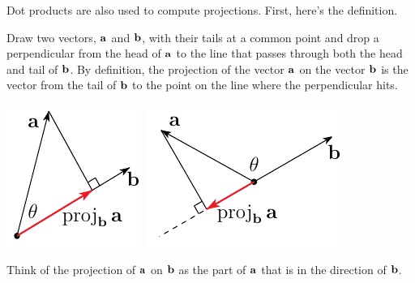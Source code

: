 Dot products are also used to compute projections.  First, here's
the definition.

\begin{defn}[Projection]\label{def:projection}
Draw two vectors, $\mathbf{a}$ and $\mathbf{b}$,
with their tails at a common point and drop a perpendicular from the head of
$\mathbf{a}$ to the line that passes through both the head and tail of $\mathbf{b}$. 
By definition, the projection of the vector $\mathbf{a}$
on the vector $\mathbf{b}$ is the vector from the tail of $\mathbf{b}$ to the point
on the line where the perpendicular hits.
      \begin{efig} 
      \begin{center}
      \includegraphics{projA.pdf}\qquad\qquad
      \includegraphics{projB.pdf}
      \end{center}
      \end{efig}
\end{defn}\noindent
Think of the projection of $\mathbf{a}$ on $\mathbf{b}$ as the part of $\mathbf{a}$ that is in the 
direction of $\mathbf{b}$.

